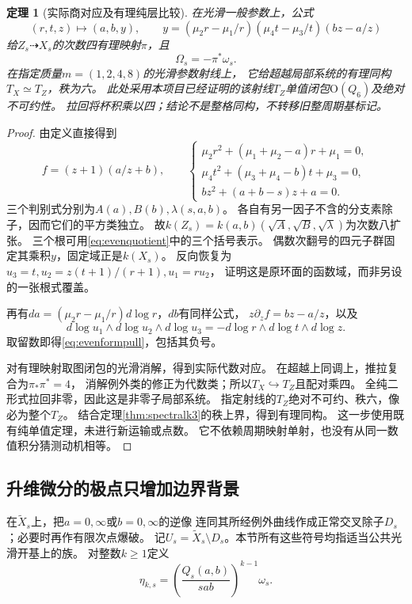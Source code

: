 \documentclass[11pt,a4paper]{ctexart}
\theoremstyle{cnplain}\newtheorem{theorem}{定理}[section]
\theoremstyle{definition}\newtheorem{definition}[theorem]{定义}
\theoremstyle{remark}\newtheorem{remark}[theorem]{注}
\begin{document}
\begin{theorem}[实际商对应及有理纯层比较]\label{thm:evenquotient}
在光滑一般参数上，公式
\begin{equation}\label{eq:evenquotient}
 (r,t,z)\longmapsto (a,b,y),\qquad
 y=(\mu_2r-\mu_1/r)(\mu_4t-\mu_3/t)(bz-a/z)
\end{equation}
给$Z_s\dashrightarrow X_s$的次数四有理映射$\pi$，且
\begin{equation}\label{eq:evenformpull}
                  \Omega_s=-\pi^*\omega_s.
\end{equation}
在指定质量$m=(1,2,4,8)$的光滑参数射线上，
它给超越局部系统的有理同构$T_X\simeq T_Z$，秩为六。
此处采用本项目已经证明的该射线$T_Z$单值闭包$\mathrm O(Q_6)$及绝对不可约性。
拉回将杯积乘以四；结论不是整格同构，不转移旧整周期基标记。
\end{theorem}
\begin{proof}
由定义直接得到
\[
 f=(z+1)(a/z+b),\qquad
 \begin{cases}
 \mu_2r^2+(\mu_1+\mu_2-a)r+\mu_1=0,\\
 \mu_4t^2+(\mu_3+\mu_4-b)t+\mu_3=0,\\
 bz^2+(a+b-s)z+a=0.
 \end{cases}
\]
三个判别式分别为$A(a),B(b),\lambda(s,a,b)$。
各自有另一因子不含的分支素除子，因而它们的平方类独立。
故$k(Z_s)=k(a,b)(\sqrt A,\sqrt B,\sqrt\lambda)$为次数八扩张。
三个根可用\eqref{eq:evenquotient}中的三个括号表示。
偶数次翻号的四元子群固定其乘积$y$，固定域正是$k(X_s)$。
反向恢复为$u_3=t,u_2=z(t+1)/(r+1),u_1=ru_2$，
证明这是原环面的函数域，而非另设的一张根式覆盖。

再有$da=(\mu_2r-\mu_1/r)d\log r$，$db$有同样公式，
$z\partial_z f=bz-a/z$，以及
\[
 d\log u_1\wedge d\log u_2\wedge d\log u_3
       =-d\log r\wedge d\log t\wedge d\log z.
\]
取留数即得\eqref{eq:evenformpull}，包括其负号。

对有理映射取图闭包的光滑消解，得到实际代数对应。
在超越上同调上，推拉复合为$\pi_*\pi^*=4$，
消解例外类的修正为代数类；所以$T_X\hookrightarrow T_Z$且配对乘四。
全纯二形式拉回非零，因此这是非零子局部系统。
指定射线的$T_Z$绝对不可约、秩六，像必为整个$T_Z$。
结合定理\ref{thm:spectralk3}的秩上界，得到有理同构。
这一步使用既有纯单值定理，未进行新运输或点数。
它不依赖周期映射单射，也没有从同一数值积分猜测动机相等。
\end{proof}

\subsection{升维微分的极点只增加边界背景}
在$\widetilde X_s$上，把$a=0,\infty$或$b=0,\infty$的逆像
连同其所经例外曲线作成正常交叉除子$D_s$；必要时再作有限次点爆破。
记$U_s=\widetilde X_s\setminus D_s$。本节所有这些符号均指适当公共光滑开基上的族。
对整数$k\ge1$定义
\begin{equation}\label{eq:eveneta}
 \eta_{k,s}=\left(\frac{Q_s(a,b)}{sab}\right)^{k-1}\omega_s.
\end{equation}
\end{document}
